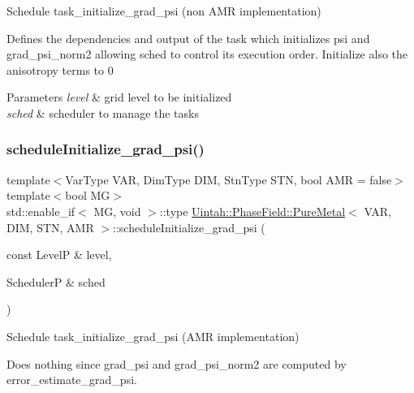 Schedule task\+\_\+initialize\+\_\+grad\+\_\+psi (non A\+MR implementation) 

Defines the dependencies and output of the task which initializes psi and grad\+\_\+psi\+\_\+norm2 allowing sched to control its execution order. Initialize also the anisotropy terms to 0


\begin{DoxyParams}{Parameters}
{\em level} & grid level to be initialized \\
\hline
{\em sched} & scheduler to manage the tasks \\
\hline
\end{DoxyParams}
\mbox{\label{classUintah_1_1PhaseField_1_1PureMetal_a08fd26626ff3782a5805db3725d2da25}} 
\subsubsection{\texorpdfstring{schedule\+Initialize\+\_\+grad\+\_\+psi()}{scheduleInitialize\_grad\_psi()}\hspace{0.1cm}{\footnotesize\ttfamily [2/2]}}
{\footnotesize\ttfamily template$<$Var\+Type V\+AR, Dim\+Type D\+IM, Stn\+Type S\+TN, bool A\+MR = false$>$ \\
template$<$bool MG$>$ \\
std\+::enable\+\_\+if$<$ MG, void $>$\+::type \hyperlink{classUintah_1_1PhaseField_1_1PureMetal}{Uintah\+::\+Phase\+Field\+::\+Pure\+Metal}$<$ V\+AR, D\+IM, S\+TN, A\+MR $>$\+::schedule\+Initialize\+\_\+grad\+\_\+psi (\begin{DoxyParamCaption}\item[{const LevelP \&}]{level,  }\item[{SchedulerP \&}]{sched }\end{DoxyParamCaption})\hspace{0.3cm}{\ttfamily [protected]}}



Schedule task\+\_\+initialize\+\_\+grad\+\_\+psi (A\+MR implementation) 

Does nothing since grad\+\_\+psi and grad\+\_\+psi\+\_\+norm2 are computed by error\+\_\+estimate\+\_\+grad\+\_\+psi.


